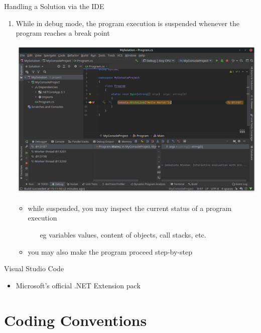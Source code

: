 \documentclass[presentation]{beamer}
\begin{document}
\begin{frame}[allowframebreaks]{Handling a Solution via the IDE}
\begin{enumerate}
        \framebreak
    
        \item While in debug mode, the program execution is suspended whenever the program \alert{reaches} a break point
        \begin{center}
            \includegraphics[width=.6\linewidth]{img/rider-6}
        \end{center}
        \begin{itemize}
            \item while suspended, you may \alert{inspect} the current status of a program execution
            \begin{itemize}
                \item[eg] variables values, content of objects, call stacks, etc.
            \end{itemize}
            \item you may also make the program proceed \alert{step-by-step}
        \end{itemize}

    \end{enumerate}

\end{frame}

\begin{frame}[fragile]{Visual Studio Code}

\begin{itemize}
\item Microsoft's official \alert{.NET Extension pack}
\end{itemize}

\end{frame}

\section{Coding Conventions}
\end{document}
